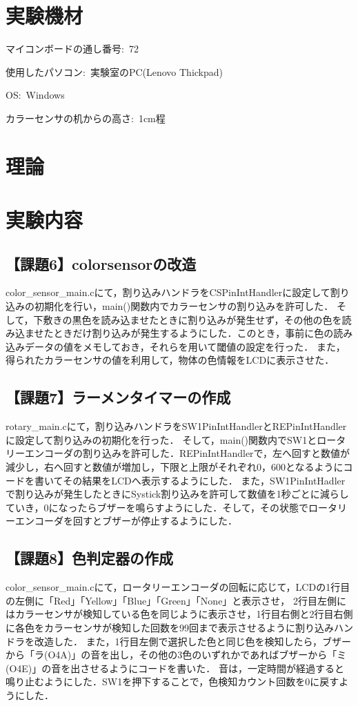 \documentclass{jlreq}
\begin{document}
\tableofcontents
\clearpage

\section{実験機材}

マイコンボードの通し番号:\ 72

使用したパソコン:\ 実験室のPC(Lenovo Thickpad)

OS:\ Windows

カラーセンサの机からの高さ:\ 1cm程

\section{理論}

\section{実験内容}
\subsection{【課題6】colorsensorの改造}
color\_sensor\_main.cにて，割り込みハンドラをCSPinIntHandlerに設定して割り込みの初期化を行い，main()関数内でカラーセンサの割り込みを許可した．
そして，下敷きの黒色を読み込ませたときに割り込みが発生せず，その他の色を読み込ませたときだけ割り込みが発生するようにした．このとき，事前に色の読み込みデータの値をメモしておき，それらを用いて閾値の設定を行った．
また，得られたカラーセンサの値を利用して，物体の色情報をLCDに表示させた．

\subsection{【課題7】ラーメンタイマーの作成}
rotary\_main.cにて，割り込みハンドラをSW1PinIntHandlerとREPinIntHandlerに設定して割り込みの初期化を行った．
そして，main()関数内でSW1とロータリーエンコーダの割り込みを許可した．REPinIntHandlerで，左へ回すと数値が減少し，右へ回すと数値が増加し，下限と上限がそれぞれ0，600となるようにコードを書いてその結果をLCDへ表示するようにした．
また，SW1PinIntHadlerで割り込みが発生したときにSystick割り込みを許可して数値を1秒ごとに減らしていき，0になったらブザーを鳴らすようにした．そして，その状態でロータリーエンコーダを回すとブザーが停止するようにした．

\subsection{【課題8】色判定器の作成}
color\_sensor\_main.cにて，ロータリーエンコーダの回転に応じて，LCDの1行目の左側に「Red」「Yellow」「Blue」「Green」「None」と表示させ，
2行目左側にはカラーセンサが検知している色を同じように表示させ，1行目右側と2行目右側に各色をカラーセンサが検知した回数を99回まで表示させるように割り込みハンドラを改造した．
また，1行目左側で選択した色と同じ色を検知したら，ブザーから「ラ(O4A)」の音を出し，その他の3色のいずれかであればブザーから「ミ(O4E)」の音を出させるようにコードを書いた．
音は，一定時間が経過すると鳴り止むようにした．SW1を押下することで，色検知カウント回数を0に戻すようにした．
\end{document}
